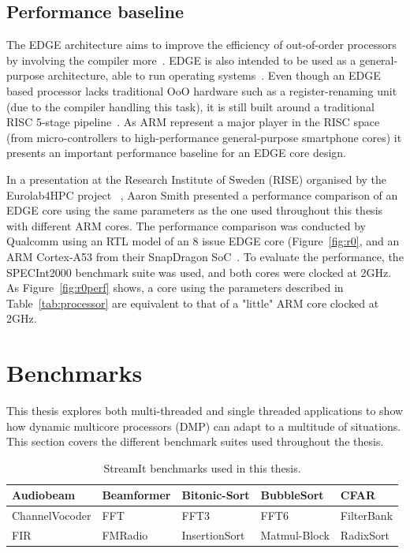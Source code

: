 \subsection{Performance baseline}
The EDGE architecture aims to improve the efficiency of out-of-order processors by involving the compiler more~\cite{aarontalk, gray2018edge}.
EDGE is also intended to be used as a general-purpose architecture, able to run operating systems~\cite{aarontalk}.
Even though an EDGE based processor lacks traditional OoO hardware such as a register-renaming unit (due to the compiler handling this task), it is still built around a traditional RISC 5-stage pipeline~\cite{gray2018edge}.
As ARM represent a major player in the RISC space (from micro-controllers to high-performance general-purpose smartphone cores) it presents an important performance baseline for an EDGE core design.

In a presentation at the Research Institute of Sweden (RISE) organised by the Eurolab4HPC project~\cite{eurolab4hpc, aarontalk} , Aaron Smith presented a performance comparison of an EDGE core using the same parameters as the one used throughout this thesis with different ARM cores.
The performance comparison was conducted by Qualcomm using an RTL model of an 8 issue EDGE core (Figure~\ref{fig:r0}, and an ARM Cortex-A53 from their SnapDragon SoC~\cite{aarontalk}.
To evaluate the performance, the SPECInt2000 benchmark suite was used, and both cores were clocked at 2GHz.
As Figure~\ref{fig:r0perf} shows, a core using the parameters described in Table~\ref{tab:processor} are equivalent to that of a "little" ARM core clocked at 2GHz.

\section{Benchmarks}
This thesis explores both multi-threaded and single threaded applications to show how dynamic multicore processors (DMP) can adapt to a multitude of situations. 
This section covers the different benchmark suites used throughout the thesis.

\begin{table}[t]
\centering
  \smaller
 \begin{tabular} { | l | l | l | l | l | }
 \hline
  Audiobeam&   Beamformer&  Bitonic-Sort  &  BubbleSort & CFAR \\ \hline
  ChannelVocoder &  FFT& FFT3 & FFT6&  FilterBank \\ \hline
  FIR &  FMRadio &   InsertionSort &   Matmul-Block &  RadixSort\\ \hline
 \end{tabular}
  \caption{StreamIt benchmarks used in this thesis.}\label{tab:streamwl}
\end{table}

